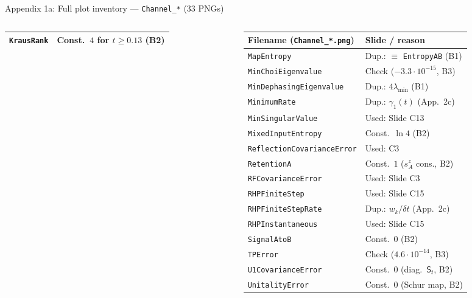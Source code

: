 \documentclass[aspectratio=169,11pt]{beamer}
\newcommand{\St}{\mathsf S_t}
\begin{document}
\begin{frame}{Appendix 1a: Full plot inventory --- \texttt{Channel\_*} ($33$ PNGs)}
\begin{columns}[T,totalwidth=\textwidth]
\begin{column}{0.49\textwidth}
\begin{tabular}{@{}ll@{}}
\texttt{KrausRank} & Const.\ $4$ for $t\ge 0.13$ (B2) \\\bottomrule
\end{tabular}
\end{column}
\begin{column}{0.49\textwidth}
\begin{tabular}{@{}ll@{}}
\toprule
Filename (\texttt{Channel\_*.png}) & Slide / reason \\\midrule
\texttt{MapEntropy} & Dup.: $\equiv$ \texttt{EntropyAB} (B1) \\
\texttt{MinChoiEigenvalue} & Check ($-3.3\cdot 10^{-15}$, B3) \\
\texttt{MinDephasingEigenvalue} & Dup.: $4\lambda_{\min}$ (B1) \\
\texttt{MinimumRate} & Dup.: $\gamma_1(t)$ (App.\ 2c) \\
\texttt{MinSingularValue} & Used: Slide C13 \\
\texttt{MixedInputEntropy} & Const.\ $\ln 4$ (B2) \\
\texttt{ReflectionCovarianceError} & Used: C3 \\
\texttt{RetentionA} & Const.\ $1$ ($s_A^z$ cons., B2) \\
\texttt{RFCovarianceError} & Used: Slide C3 \\
\texttt{RHPFiniteStep} & Used: Slide C15 \\
\texttt{RHPFiniteStepRate} & Dup.: $w_k/\delta t$ (App.\ 2c) \\
\texttt{RHPInstantaneous} & Used: Slide C15 \\
\texttt{SignalAtoB} & Const.\ $0$ (B2) \\
\texttt{TPError} & Check ($4.6\cdot 10^{-14}$, B3) \\
\texttt{U1CovarianceError} & Const.\ $0$ (diag.\ $\St$, B2) \\
\texttt{UnitalityError} & Const.\ $0$ (Schur map, B2) \\\bottomrule
\end{tabular}
\end{column}
\end{columns}
\end{frame}
\end{document}
